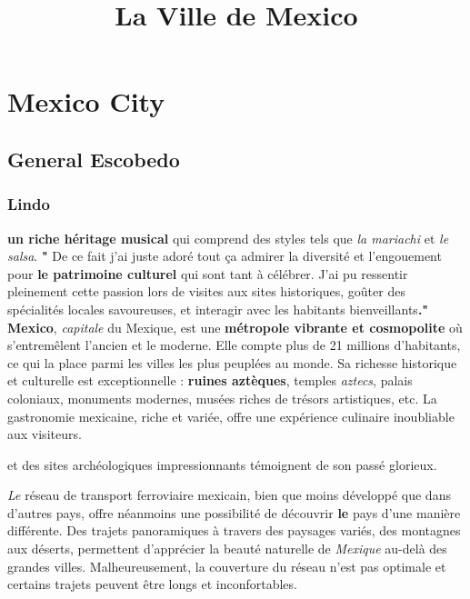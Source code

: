 \documentclass[12pt, a4paper]{article}
\title{La Ville de Mexico}
\author{}
\date{}
\begin{document}
\maketitle

\section*{Mexico City}

\subsection{General Escobedo}        

\subsubsection{Lindo}


\textbf{un riche héritage musical} qui comprend des styles tels que \textit{la mariachi} et \textit{le salsa}. \textbf{"}
De ce fait j'ai juste adoré tout ça admirer la diversité et l’engouement pour \textbf{le patrimoine culturel} qui sont tant à célébrer. J’ai pu ressentir pleinement cette passion lors de visites aux sites historiques, goûter des spécialités locales savoureuses, et interagir avec les habitants bienveillants\textbf{."}
\textbf{Mexico}, \textit{capitale} du Mexique, est une \textbf{métropole vibrante et cosmopolite} où s'entremêlent l'ancien et le moderne. Elle compte plus de 21 millions d'habitants, ce qui la place parmi les villes les plus peuplées au monde. Sa richesse historique et culturelle est exceptionnelle : \textbf{ruines aztèques}, temples \textit{aztecs}, palais coloniaux, monuments modernes, musées riches de trésors artistiques, etc. La gastronomie mexicaine, riche et variée, offre une expérience culinaire inoubliable aux visiteurs.

et des sites archéologiques impressionnants témoignent de son passé glorieux.


{}

\textit{Le} réseau de transport ferroviaire mexicain, bien que moins développé que dans d’autres pays, offre néanmoins une possibilité de découvrir \textbf{le} pays d’une manière différente.  Des trajets panoramiques à travers des paysages variés, des montagnes aux déserts, permettent d’apprécier la beauté naturelle de \textit{Mexique} au-delà des grandes villes.  Malheureusement, la couverture du réseau n’est pas optimale et certains trajets peuvent être longs et inconfortables.
\end{document}
